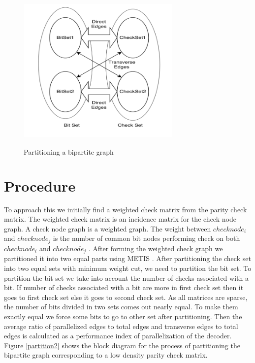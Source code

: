  \begin{figure}[h]
 \begin{center}
    \includegraphics[height=8cm,width=8cm]{partition1.jpg}
    \caption{Partitioning a bipartite graph} 
 \end{center}
\end{figure}


\section{Procedure}
To approach this we initially find a weighted check matrix from the parity check matrix. The weighted check matrix is an incidence matrix for the check node graph. A check node graph is a weighted graph. The weight between $checknode_{i}$ and $checknode_{j}$ is the number of common bit nodes performing check on both $checknode_{i}$ and $checknode_{j}$ . After forming the
weighted check graph we partitioned it into two equal parts using METIS \cite{6}. After partitioning the check set into two equal sets with minimum weight cut, we need to partition the bit set. To partition the bit set we take into account the number of checks associated with a bit. If number of checks associated with a bit are more in first check set then it goes to first check set else it goes to second check set. As all matrices are sparse, the number of bits divided in two sets comes out nearly equal. To make them exactly equal we force some bits to go to other set after partitioning. Then the average ratio of parallelized edges to total edges and transverse edges to total edges is calculated as a performance index of parallelization of the
decoder. Figure \ref{partition2} shows the block diagram for the process of partitioning the bipartite graph corresponding to a low density parity check matrix.


